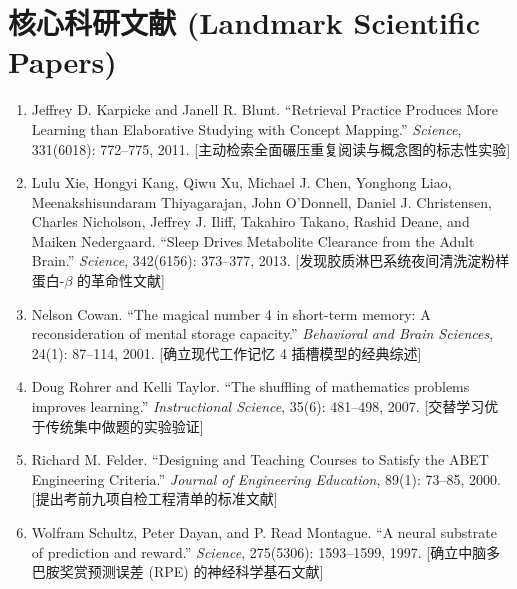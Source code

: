 \documentclass[12pt,a4paper,openany]{ctexbook}
\begin{document}
\section*{核心科研文献 (Landmark Scientific Papers)}
\begin{enumerate}
    \item Jeffrey D. Karpicke and Janell R. Blunt. ``Retrieval Practice Produces More Learning than Elaborative Studying with Concept Mapping.'' \emph{Science}, 331(6018): 772--775, 2011. [主动检索全面碾压重复阅读与概念图的标志性实验]
    \item Lulu Xie, Hongyi Kang, Qiwu Xu, Michael J. Chen, Yonghong Liao, Meenakshisundaram Thiyagarajan, John O'Donnell, Daniel J. Christensen, Charles Nicholson, Jeffrey J. Iliff, Takahiro Takano, Rashid Deane, and Maiken Nedergaard. ``Sleep Drives Metabolite Clearance from the Adult Brain.'' \emph{Science}, 342(6156): 373--377, 2013. [发现胶质淋巴系统夜间清洗淀粉样蛋白-$\beta$ 的革命性文献]
    \item Nelson Cowan. ``The magical number 4 in short-term memory: A reconsideration of mental storage capacity.'' \emph{Behavioral and Brain Sciences}, 24(1): 87--114, 2001. [确立现代工作记忆 4 插槽模型的经典综述]
    \item Doug Rohrer and Kelli Taylor. ``The shuffling of mathematics problems improves learning.'' \emph{Instructional Science}, 35(6): 481--498, 2007. [交替学习优于传统集中做题的实验验证]
    \item Richard M. Felder. ``Designing and Teaching Courses to Satisfy the ABET Engineering Criteria.'' \emph{Journal of Engineering Education}, 89(1): 73--85, 2000. [提出考前九项自检工程清单的标准文献]
    \item Wolfram Schultz, Peter Dayan, and P. Read Montague. ``A neural substrate of prediction and reward.'' \emph{Science}, 275(5306): 1593--1599, 1997. [确立中脑多巴胺奖赏预测误差 (RPE) 的神经科学基石文献]
\end{enumerate}
\end{document}
